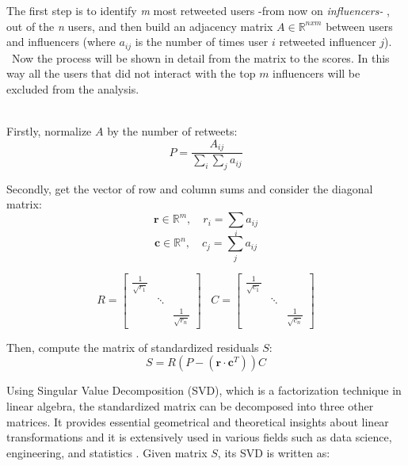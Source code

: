 The first step is to identify \textit{m }most retweeted users -from now on \textit{influencers- }, out of the \textit{n }users, and then build an adjacency matrix $A\in \mathbb{R}^{n x m}$ between users and influencers (where \(a_{ij}\) is the number of times user $i$ retweeted influencer $j$).  Now the process will be shown in detail from the matrix to the scores. In this way all the users that did not interact with the top $m$ influencers will be excluded from the analysis.

\\

Firstly, normalize $A$ by the number of retweets:
\begin{equation}
P =  \frac{A_{ij}}{\sum_{i} \sum_{j} a_{ij}}
\end{equation}

Secondly, get the vector of row and column sums and consider the diagonal matrix:
\begin{equation}
\textbf{r} \in \mathbb{R}^m, \quad  r_i = \sum_{i} a_{ij}
\end{equation}
\begin{equation}
\textbf{c} \in \mathbb{R}^n , \quad c_j = \sum_{j} a_{ij} 
\end{equation}





\begin{equation}
  R =
  \begin{bmatrix}
    \frac{1}{{\sqrt{r_{1}}}} & & \\
    & \ddots & \\
    & & \frac{1}{{\sqrt{r_{n}}}}
  \end{bmatrix}
  \;\;\;  C =
  \begin{bmatrix}
    \frac{1}{{\sqrt{c_{1}}}} & & \\
    & \ddots & \\
    & & \frac{1}{{\sqrt{c_{n}}}}
  \end{bmatrix}
\end{equation}

Then, compute the matrix of standardized residuals $S$:
\begin{equation}
S = R\left(P - (\textbf{r}\cdot \textbf{c}^T)\right)C
\end{equation}

Using Singular Value Decomposition (SVD), which is a factorization technique in linear algebra,  the standardized matrix  can be decomposed into three other matrices. It provides essential geometrical and theoretical insights about linear transformations and it is extensively used in various fields such as data science, engineering, and statistics \cite{golub1970singular}. Given  matrix $S$, its SVD is  written as:

